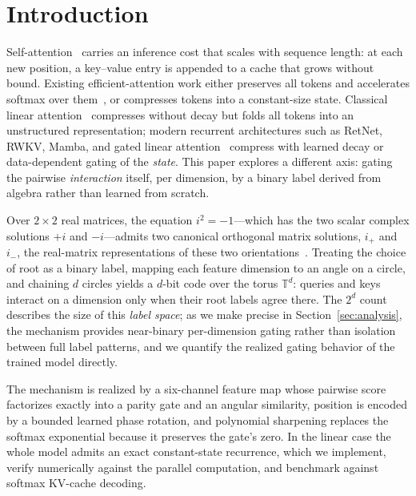 \documentclass{article}
\begin{document}
\section{Introduction}
\label{sec:intro}

Self-attention~\cite{vaswani2017attention} carries an inference cost that scales with sequence length: at each new position, a key--value entry is appended to a cache that grows without bound. Existing efficient-attention work either preserves all tokens and accelerates softmax over them~\cite{dao2022flashattention, wang2020linformer}, or compresses tokens into a constant-size state. Classical linear attention~\cite{katharopoulos2020transformers, choromanski2021rethinking} compresses without decay but folds all tokens into an unstructured representation; modern recurrent architectures such as RetNet, RWKV, Mamba, and gated linear attention~\cite{sun2023retnet, peng2023rwkv, gu2023mamba, yang2024gla} compress with learned decay or data-dependent gating of the \emph{state}. This paper explores a different axis: gating the pairwise \emph{interaction} itself, per dimension, by a binary label derived from algebra rather than learned from scratch.

Over $2 \times 2$ real matrices, the equation $i^2 = -1$---which has the two scalar complex solutions $+i$ and $-i$---admits two canonical orthogonal matrix solutions, $i_+$ and $i_-$, the real-matrix representations of these two orientations~\cite{patel2025quantuminspired}. Treating the choice of root as a binary label, mapping each feature dimension to an angle on a circle, and chaining $d$ circles yields a $d$-bit code over the torus $\mathbb{T}^d$: queries and keys interact on a dimension only when their root labels agree there. The $2^d$ count describes the size of this \emph{label space}; as we make precise in Section~\ref{sec:analysis}, the mechanism provides near-binary per-dimension gating rather than isolation between full label patterns, and we quantify the realized gating behavior of the trained model directly.

The mechanism is realized by a six-channel feature map whose pairwise score factorizes exactly into a parity gate and an angular similarity, position is encoded by a bounded learned phase rotation, and polynomial sharpening replaces the softmax exponential because it preserves the gate's zero. In the linear case the whole model admits an exact constant-state recurrence, which we implement, verify numerically against the parallel computation, and benchmark against softmax KV-cache decoding.
\end{document}

